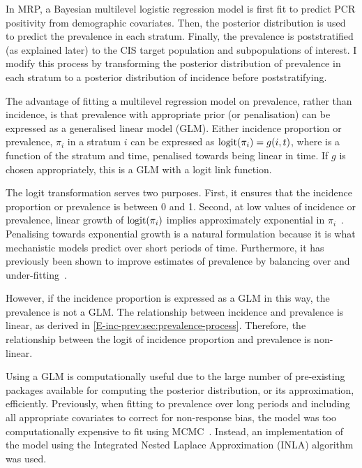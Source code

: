 \documentclass[thesis.tex]{subfiles}
\begin{document}
In MRP, a Bayesian multilevel logistic regression model is first fit to predict PCR positivity from demographic covariates.
Then, the posterior distribution is used to predict the prevalence in each stratum.
Finally, the prevalence is poststratified (as explained later) to the CIS target population and subpopulations of interest.
I modify this process by transforming the posterior distribution of prevalence in each stratum to a posterior distribution of incidence before poststratifying.

The advantage of fitting a multilevel regression model on prevalence, rather than incidence, is that prevalence with appropriate prior (or penalisation) can be expressed as a generalised linear model (GLM).
Either incidence proportion or prevalence, $\pi_i$ in a stratum $i$ can be expressed as $\operatorname{logit}(\pi_i) = g(i, t)$, where is a function of the stratum and time, penalised towards being linear in time.
If $g$ is chosen appropriately, this is a GLM with a logit link function.

The logit transformation serves two purposes.
First, it ensures that the incidence proportion or prevalence is between 0 and 1.
Second, at low values of incidence or prevalence, linear growth of $\operatorname{logit}(\pi_i)$ implies approximately exponential in $\pi_i$~\autocite[see discussion in][and references therein]{ealesAppropriately}.
Penalising towards exponential growth is a natural formulation because it is what mechanistic models predict over short periods of time.
Furthermore, it has previously been shown to improve estimates of prevalence by balancing over and under-fitting~\autocite{ealesAppropriately}.

However, if the incidence proportion is expressed as a GLM in this way, the prevalence is not a GLM.
The relationship between incidence and prevalence is linear, as derived in \cref{E-inc-prev:sec:prevalence-process}.
Therefore, the relationship between the logit of incidence proportion and prevalence is non-linear.

Using a GLM is computationally useful due to the large number of pre-existing packages available for computing the posterior distribution, or its approximation, efficiently.
Previously, when fitting to prevalence over long periods and including all appropriate covariates to correct for non-response bias, the model was too computationally expensive to fit using MCMC~.
Instead, an implementation of the model using the Integrated Nested Laplace Approximation (INLA) algorithm was used.
\end{document}
